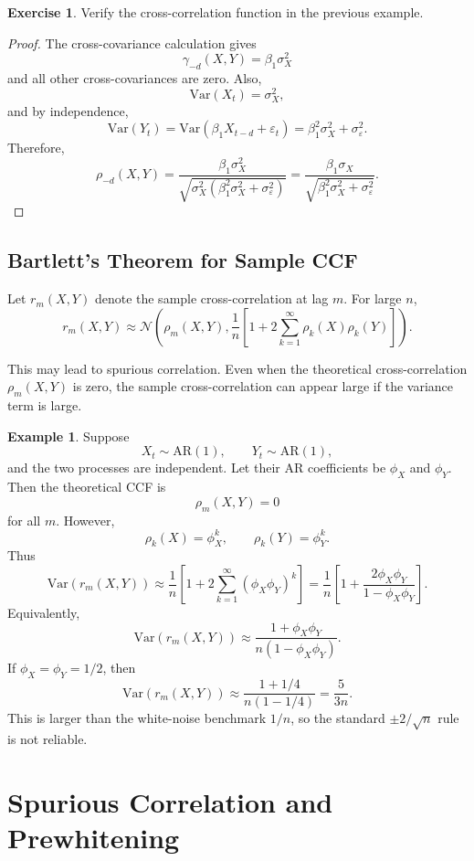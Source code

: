 \documentclass[12pt,oneside]{book}
\numberwithin{equation}{section}
\theoremstyle{definition}
\newtheorem{example}{Example}[section]
\newtheorem{exercise}{Exercise}[section]
\theoremstyle{plain}
\theoremstyle{remark}
\newcommand{\Var}{\mathrm{Var}}
\newcommand{\Normal}{\mathcal{N}}
\begin{document}
\begin{exercise}
Verify the cross-correlation function in the previous example.
\end{exercise}

\begin{proof}
The cross-covariance calculation gives
\[
\gamma_{-d}(X,Y)=\beta_1\sigma_X^2
\]
and all other cross-covariances are zero. Also,
\[
\Var(X_t)=\sigma_X^2,
\]
and by independence,
\[
\Var(Y_t)=\Var(\beta_1X_{t-d}+\varepsilon_t)
=
\beta_1^2\sigma_X^2+\sigma_\varepsilon^2.
\]
Therefore,
\[
\rho_{-d}(X,Y)
=
\frac{\beta_1\sigma_X^2}
{\sqrt{\sigma_X^2(\beta_1^2\sigma_X^2+\sigma_\varepsilon^2)}}
=
\frac{\beta_1\sigma_X}
{\sqrt{\beta_1^2\sigma_X^2+\sigma_\varepsilon^2}}.
\]
\end{proof}

\subsection{Bartlett's Theorem for Sample CCF}

Let $r_m(X,Y)$ denote the sample cross-correlation at lag $m$. For large $n$,
\[
r_m(X,Y)
\approx
\Normal\left(
\rho_m(X,Y),
\frac{1}{n}
\left[
1+2\sum_{k=1}^{\infty}\rho_k(X)\rho_k(Y)
\right]
\right).
\]

This may lead to spurious correlation. Even when the theoretical cross-correlation $\rho_m(X,Y)$ is zero, the sample cross-correlation can appear large if the variance term is large.

\begin{example}
Suppose
\[
X_t\sim \mathrm{AR}(1),
\qquad
Y_t\sim \mathrm{AR}(1),
\]
and the two processes are independent. Let their AR coefficients be $\phi_X$ and $\phi_Y$. Then the theoretical CCF is
\[
\rho_m(X,Y)=0
\]
for all $m$. However,
\[
\rho_k(X)=\phi_X^k,
\qquad
\rho_k(Y)=\phi_Y^k.
\]
Thus
\[
\Var(r_m(X,Y))
\approx
\frac{1}{n}
\left[
1+2\sum_{k=1}^{\infty}(\phi_X\phi_Y)^k
\right]
=
\frac{1}{n}
\left[
1+\frac{2\phi_X\phi_Y}{1-\phi_X\phi_Y}
\right].
\]
Equivalently,
\[
\Var(r_m(X,Y))
\approx
\frac{1+\phi_X\phi_Y}{n(1-\phi_X\phi_Y)}.
\]
If $\phi_X=\phi_Y=1/2$, then
\[
\Var(r_m(X,Y))
\approx
\frac{1+1/4}{n(1-1/4)}
=
\frac{5}{3n}.
\]
This is larger than the white-noise benchmark $1/n$, so the standard $\pm 2/\sqrt{n}$ rule is not reliable.
\end{example}

\section{Spurious Correlation and Prewhitening}
\end{document}
